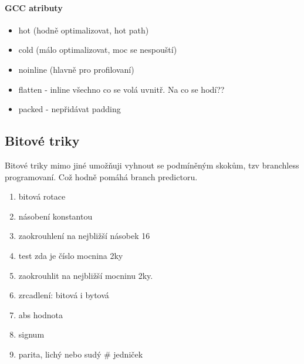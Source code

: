 \paragraph{GCC atributy}
\begin{itemize}
	\item hot (hodně optimalizovat, hot path)
	\item cold (málo optimalizovat, moc se nespouští)
	\item noinline (hlavně pro profilovaní)
	\item flatten - inline všechno co se volá uvnitř.
		Na co se hodí??
	\item packed - nepřidávat padding
\end{itemize}

\subsection{Bitové triky}
Bitové triky mimo jiné umožňuji vyhnout se podmíněným skokům, tzv branchless programovaní.
Což hodně pomáhá branch predictoru.
\begin{exercise}
	\begin{enumerate}
		\item bitová rotace
		\item násobení konstantou
		\item zaokrouhlení na nejbližší násobek 16
		\item test zda je číslo mocnina 2ky
		\item zaokrouhlit na nejbližší mocninu 2ky.
		\item zrcadlení: bitová i bytová
		\item abs hodnota
		\item signum
		\item parita, lichý nebo sudý \# jedniček
	\end{enumerate}
\end{exercise}
